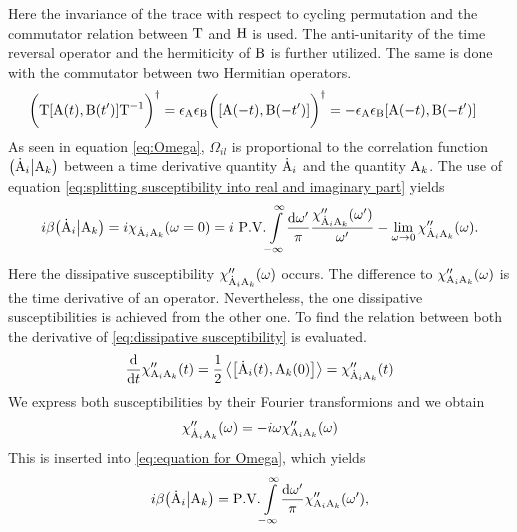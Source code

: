 %
Here the invariance of the trace with respect to cycling permutation and the commutator relation between $\mathrm{T}$ and $\mathrm{H}$ is used.
The anti-unitarity of the time reversal operator and the hermiticity of $\mathrm{B}$ is further utilized.
The same is done with the commutator between two Hermitian operators.
%
\begin{align}
	\bigg(\mt{T} \comm{\mt{A}(t)}{\mt{B}(t')} \mt{T}^{-1}\bigg)^{\dag} &= \epsilon_{\mt{A}} \epsilon_{\mt{B}} \bigg(\comm{\mt{A}(-t)}{\mt{B}(-t')}\bigg)^{\dag} = - \epsilon_{\mt{A}} \epsilon_{\mt{B}} \comm{\mt{A}(-t)}{\mt{B}(-t')}
	\label{eq:time reversal commutator}
\end{align}
%
As seen in equation \eqref{eq:Omega}, $\Omega_{il}$ is proportional to the correlation function $\big({\dot{\mathrm{A}}_{i}}\big|{\mathrm{A}_{k}}\big)$ between a time derivative quantity $\dot{\mathrm{A}}_{i}$ and the quantity $\mathrm{A}_{k}$.
The use of equation \eqref{eq:splitting susceptibility into real and imaginary part} yields
%
\begin{align}
	i \beta \obraket{\dot{\mt{A}}_{i}}{\mt{A}_{k}} = i \chi_{\dot{\mt{A}}_{i} \mt{A}_{k}}(\omega=0) = i\ \PV{\int\limits_{-\infty}^{\infty}} \frac{\dd{\omega'}}{\pi} \frac{\chi''_{\dot{\mt{A}}_{i} \mt{A}_{k}}(\omega')}{\omega'} - \lim\limits_{\omega \to 0} \chi''_{\dot{\mt{A}}_{i} \mt{A}_{k}}(\omega).
	\label{eq:equation for Omega}
\end{align}
%
Here the dissipative susceptibility $\chi''_{\dot{\mathrm{A}}_{i} \mathrm{A}_{k}}(\omega)$ occurs.
The difference to $\chi''_{\mathrm{A}_{i} \mathrm{A}_{k}}(\omega)$ is the time derivative of an operator.
Nevertheless, the one dissipative susceptibilities is achieved from the other one.
To find the relation between both the derivative of \eqref{eq:dissipative susceptibility} is evaluated.
%
\begin{align}
	\dv{t} \chi''_{\mt{A}_{i} \mt{A}_{k}}(t) = \frac{1}{2} \expval{\comm{\dot{\mt{A}}_{i}(t)}{\mt{A}_{k}(0)}} = \chi''_{\dot{\mt{A}}_{i} \mt{A}_{k}}(t)
\end{align}
%
We express both susceptibilities by their Fourier transformions and we obtain
%
\begin{align}
	\chi''_{\dot{\mathrm{A}}_{i} \mathrm{A}_{k}}(\omega) = - i \omega \chi''_{\mathrm{A}_{i} \mathrm{A}_{k}}(\omega)
\end{align}
%
This is inserted into \eqref{eq:equation for Omega}, which yields
%
\begin{align}
	i \beta \obraket{\dot{\mt{A}}_{i}}{\mt{A}_{k}} = \PV{\int\limits_{-\infty}^{\infty}} \frac{\dd{\omega'}}{\pi} \chi''_{\mt{A}_{i} \mt{A}_{k}}(\omega'),
	\label{eq:equation for Omega depend on Chi''}
\end{align}
